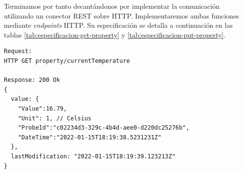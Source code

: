 Terminamos por tanto decantándonos por implementar la comunicación utilizando un conector REST sobre HTTP. Implementaremos ambas funciones mediante \emph{endpoints} HTTP. Su especificación se detalla a continuación en las tablas \ref{tab:especificacion-get-property} y \ref{tab:especificacion-put-property}.

\newsavebox\getpropertyrequestbox
\begin{lrbox}{\getpropertyrequestbox}
  \begin{minipage}[t]{1in}
    \begin{verbatim}
Request:
HTTP GET property/currentTemperature

Response: 200 Ok
{
  value: {
    "Value":16.79,
    "Unit": 1, // Celsius
    "ProbeId":"c02234d3-329c-4b4d-aee0-d220dc25276b",
    "DateTime":"2022-01-15T18:19:38.5231231Z"
  },
  lastModification: "2022-01-15T18:19:39.123213Z"
}
    \end{verbatim}
  \end{minipage}
\end{lrbox}

